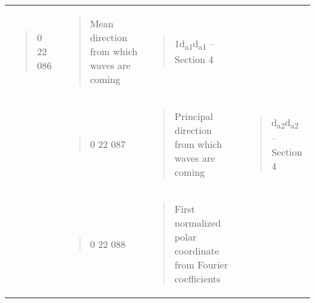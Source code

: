 \begin{longtable}[]{@{}llll@{}}
\begin{minipage}[t]{0.22\columnwidth}
\begin{quote}
0 22 086
\end{quote}\strut
\end{minipage} & \begin{minipage}[t]{0.22\columnwidth}\raggedright
\begin{quote}
Mean direction from which waves are coming
\end{quote}\strut
\end{minipage} & \begin{minipage}[t]{0.22\columnwidth}\raggedright
\begin{quote}
1d\textsubscript{a1}d\textsubscript{a1} -- Section 4
\end{quote}\strut
\end{minipage}\tabularnewline
\begin{minipage}[t]{0.22\columnwidth}\raggedright
\strut
\end{minipage} & \begin{minipage}[t]{0.22\columnwidth}\raggedright
\begin{quote}
0 22 087
\end{quote}\strut
\end{minipage} & \begin{minipage}[t]{0.22\columnwidth}\raggedright
\begin{quote}
Principal direction from which waves are coming
\end{quote}\strut
\end{minipage} & \begin{minipage}[t]{0.22\columnwidth}\raggedright
\begin{quote}
d\textsubscript{a2}d\textsubscript{a2} -- Section 4
\end{quote}\strut
\end{minipage}\tabularnewline
\begin{minipage}[t]{0.22\columnwidth}\raggedright
\strut
\end{minipage} & \begin{minipage}[t]{0.22\columnwidth}\raggedright
\begin{quote}
0 22 088
\end{quote}\strut
\end{minipage} & \begin{minipage}[t]{0.22\columnwidth}\raggedright
\begin{quote}
First normalized polar coordinate from Fourier coefficients
\end{quote}\strut
\end{minipage} & \begin{minipage}[t]{0.22\columnwidth}\raggedright

\end{minipage}
\end{longtable}
